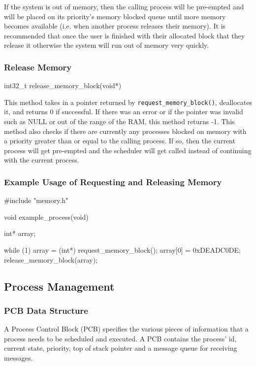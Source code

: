 \documentclass[se]{uw-wkrpt}
\begin{document}
If the system is out of memory, then the calling process will be pre-empted and will be placed on its priority's memory blocked queue until more memory becomes available (i.e. when another process releases their memory). It is recommended that once the user is finished with their allocated block that they release it otherwise the system will run out of memory very quickly.

\subsubsection{Release Memory}
\label{sec:release-memory-block}
\begin{code}
int32_t release_memory_block(void*)
\end{code}

This method takes in a pointer returned by \texttt{request\_memory\_block()}, deallocates it, and returns 0 if successful. If there was an error or if the pointer was invalid such as NULL or out of the range of the RAM, this method returns -1. This method also checks if there are currently any processes blocked on memory with a priority greater than or equal to the calling process. If so, then the current process will get pre-empted and the scheduler will get called instead of continuing with the current process.

\subsubsection{Example Usage of Requesting and Releasing Memory}
\begin{code}
#include "memory.h"

void example_process(void) {
    int* array;
    
    while (1) {
        array = (int*) request_memory_block();
        array[0] = 0xDEADC0DE;
        release_memory_block(array);
    }
}
\end{code}

\subsection{Process Management}

\subsubsection{PCB Data Structure}

A Process Control Block (PCB) specifies the various pieces of information that a process needs to be scheduled and executed. A PCB contains the process' id, current state, priority, top of stack pointer and a message queue for receiving messages.
\end{document}
